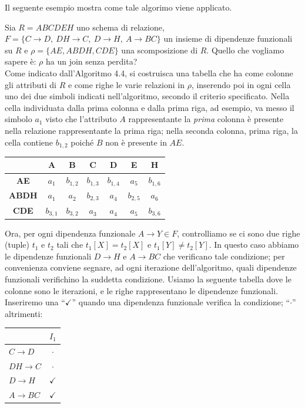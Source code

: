 Il seguente esempio mostra come tale algorimo viene applicato.\\
\begin{exmp}
 Sia $R=ABCDEH$ uno schema di relazione, $F=\{C\rightarrow D,\ DH\rightarrow C,\ D\rightarrow H,\ A \rightarrow BC\}$
 un insieme di dipendenze funzionali su $R$ e $\rho = \{AE, ABDH, CDE\}$ una scomposizione di $R$. Quello che 
 vogliamo sapere è: $\rho$ ha un join senza perdita?\\
 Come indicato dall'Algoritmo 4.4, si costruisca una tabella che ha come colonne gli attributi di $R$ e come 
 righe le varie relazioni in $\rho$, inserendo poi in ogni cella uno dei due simboli indicati nell'algoritmo,
 secondo il criterio specificato. Nella cella individuata dalla prima colonna e dalla prima riga, ad esempio, 
 va messo il simbolo $a_1$ visto che l'attributo $A$ rappresentante la \emph{prima} colonna è presente nella 
 relazione rappresentante la prima riga; nella seconda colonna, prima riga, la cella contiene $b_{1,2}$ poiché
 $B$ non è presente in $AE$.
 \begin{center}
  \begin{tabular}{c|c|c|c|c|c|c}
    & \textbf{A} & \textbf{B} &\textbf{C}&\textbf{D}&\textbf{E}&\textbf{H}\\
   \hline
   \textbf{AE} & $a_1$ & $b_{1,2}$ & $b_{1,3}$ & $b_{1,4}$ & $a_5$ & $b_{1,6}$\\
   \hline
   \textbf{ABDH}& $a_1$ & $a_2$ & $b_{2,3}$ & $a_4$ & $b_{2,5}$ & $a_6$\\
   \hline
   \textbf{CDE} & $b_{3,1}$ & $b_{3,2}$ & $a_3$ & $a_4$ & $a_5$ & $b_{3,6}$\\
  \end{tabular}
 \end{center}
 
 Ora, per ogni dipendenza funzionale $A\rightarrow Y \in F$, controlliamo se ci sono due righe (tuple) $t_1$
 e $t_2$ tali che $t_1[X] = t_2[X]$ e $t_1[Y] \not= t_2[Y]$. In questo caso abbiamo le dipendenze funzionali $D\rightarrow H$ e 
 $A \rightarrow BC$ che verificano tale condizione; per convenienza conviene segnare, ad ogni iterazione dell'algoritmo, quali 
 dipendenze funzionali verifichino la suddetta condizione. Usiamo la seguente tabella dove le colonne sono le iterazioni, 
 e le righe rappresentano le dipendenze funzionali. Inseriremo una ``$\checkmark$'' quando una dipendenza funzionale 
 verifica la condizione; ``$\cdot$'' altrimenti:\\
 \begin{center}
  \begin{tabular}{l|c|}
   & $I_1$\\
   \hline
   $C\rightarrow D$ & $\cdot$\\
   $DH\rightarrow C$& $\cdot$\\
   $D \rightarrow H$ & $\checkmark$\\
   $A \rightarrow BC$ & $\checkmark$\\
  \end{tabular}
 \end{center}
 

\end{exmp}
